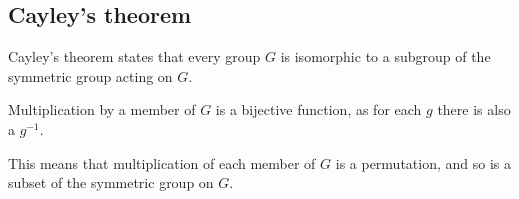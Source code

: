 
\subsection{Cayley's theorem}

Cayley's theorem states that every group \(G\) is isomorphic to a subgroup of the symmetric group acting on \(G\).

Multiplication by a member of \(G\) is a bijective function, as for each \(g\) there is also a \(g^{-1}\).

This means that multiplication of each member of \(G\) is a permutation, and so is a subset of the symmetric group on \(G\).

